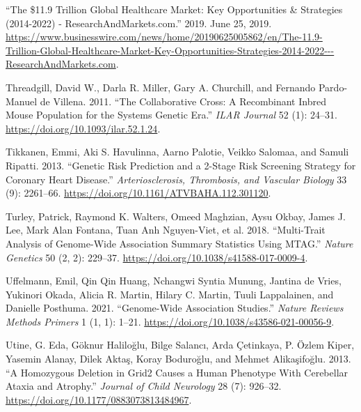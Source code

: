 \documentclass[
]{book}
\newlength{\cslhangindent}
\newlength{\cslentryspacingunit} %
\newenvironment{CSLReferences}[2] %
 {%
  \setlength{\parindent}{0pt}
  \ifodd #1
  \let\oldpar\par
  \def\par{\hangindent=\cslhangindent\oldpar}
  \fi
  \setlength{\parskip}{#2\cslentryspacingunit}
 }%
 {}
\begin{document}
\begin{CSLReferences}{1}{0}
\leavevmode{}%
{``The \$11.9 {Trillion Global Healthcare Market}: {Key Opportunities} \& {Strategies} (2014-2022) - {ResearchAndMarkets}.com.''} 2019. June 25, 2019. \url{https://www.businesswire.com/news/home/20190625005862/en/The-11.9-Trillion-Global-Healthcare-Market-Key-Opportunities-Strategies-2014-2022---ResearchAndMarkets.com}.

\leavevmode{}%
Threadgill, David W., Darla R. Miller, Gary A. Churchill, and Fernando Pardo-Manuel de Villena. 2011. {``The {Collaborative Cross}: {A Recombinant Inbred Mouse Population} for the {Systems Genetic Era}.''} \emph{ILAR Journal} 52 (1): 24--31. \url{https://doi.org/10.1093/ilar.52.1.24}.

\leavevmode{}%
Tikkanen, Emmi, Aki S. Havulinna, Aarno Palotie, Veikko Salomaa, and Samuli Ripatti. 2013. {``Genetic {Risk Prediction} and a 2-{Stage Risk Screening Strategy} for {Coronary Heart Disease}.''} \emph{Arteriosclerosis, Thrombosis, and Vascular Biology} 33 (9): 2261--66. \url{https://doi.org/10.1161/ATVBAHA.112.301120}.

\leavevmode{}%
Turley, Patrick, Raymond K. Walters, Omeed Maghzian, Aysu Okbay, James J. Lee, Mark Alan Fontana, Tuan Anh Nguyen-Viet, et al. 2018. {``Multi-Trait Analysis of Genome-Wide Association Summary Statistics Using {MTAG}.''} \emph{Nature Genetics} 50 (2, 2): 229--37. \url{https://doi.org/10.1038/s41588-017-0009-4}.

\leavevmode{}%
Uffelmann, Emil, Qin Qin Huang, Nchangwi Syntia Munung, Jantina de Vries, Yukinori Okada, Alicia R. Martin, Hilary C. Martin, Tuuli Lappalainen, and Danielle Posthuma. 2021. {``Genome-Wide Association Studies.''} \emph{Nature Reviews Methods Primers} 1 (1, 1): 1--21. \url{https://doi.org/10.1038/s43586-021-00056-9}.

\leavevmode{}%
Utine, G. Eda, Göknur Haliloğlu, Bilge Salancı, Arda Çetinkaya, P. Özlem Kiper, Yasemin Alanay, Dilek Aktaş, Koray Boduroğlu, and Mehmet Alikaşifoğlu. 2013. {``A {Homozygous Deletion} in {Grid2 Causes} a {Human Phenotype With Cerebellar Ataxia} and {Atrophy}.''} \emph{Journal of Child Neurology} 28 (7): 926--32. \url{https://doi.org/10.1177/0883073813484967}.


\end{CSLReferences}
\end{document}
